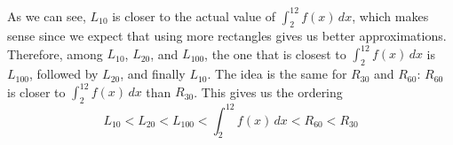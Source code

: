 \documentclass[main]{subfiles}
\begin{document}
\begin{enumerate}[resume]
\begin{solution}
\begin{center}
    \end{center}
    As we can see, $L_{10}$ is closer to the actual value of
    $\displaystyle \int_2^{12} f(x)\,dx$, which makes sense since we
    expect that using more rectangles gives us better approximations.
    Therefore, among $L_{10}$, $L_{20}$, and $L_{100}$, the one that is
    closest to $\displaystyle \int_2^{12} f(x)\,dx$ is $L_{100}$, followed
    by $L_{20}$, and finally $L_{10}$.  The idea is the same for $R_{30}$
    and $R_{60}$: $R_{60}$ is closer to $\displaystyle \int_2^{12}
    f(x)\,dx$ than $R_{30}$.  This gives us the ordering 
    \[
    \boxed{ L_{10} < L_{20}<L_{100}< \int_2^{12} f(x)\,dx <R_{60} <
      R_{30}} \]
  \end{solution}

\end{enumerate}
\end{document}
